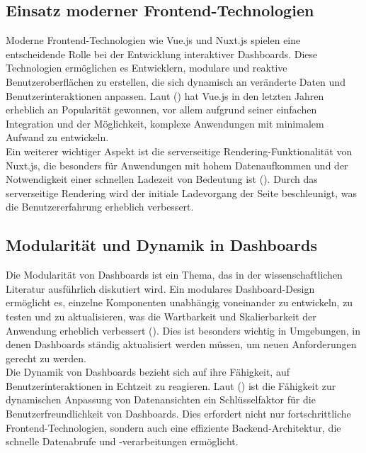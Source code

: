 \documentclass[a4paper, 12pt]{scrartcl}
\begin{document}
\subsection{Einsatz moderner Frontend-Technologien}
Moderne Frontend-Technologien wie Vue.js und Nuxt.js spielen eine entscheidende Rolle bei der Entwicklung interaktiver Dashboards. Diese Technologien ermöglichen es Entwicklern, modulare und reaktive Benutzeroberflächen zu erstellen, die sich dynamisch an veränderte Daten und Benutzerinteraktionen anpassen. Laut (\cite[S.119]{Dibia2023}) hat Vue.js in den letzten Jahren erheblich an Popularität gewonnen, vor allem aufgrund seiner einfachen Integration und der Möglichkeit, komplexe Anwendungen mit minimalem Aufwand zu entwickeln.\\[1em] Ein weiterer wichtiger Aspekt ist die serverseitige Rendering-Funktionalität von Nuxt.js, die besonders für Anwendungen mit hohem Datenaufkommen und der Notwendigkeit einer schnellen Ladezeit von Bedeutung ist (\cite[S.119]{Dibia2023}). Durch das serverseitige Rendering wird der initiale Ladevorgang der Seite beschleunigt, was die Benutzererfahrung erheblich verbessert.
\newpage

\subsection{Modularität und Dynamik in Dashboards}
Die Modularität von Dashboards ist ein Thema, das in der wissenschaftlichen Literatur ausführlich diskutiert wird. Ein modulares Dashboard-Design ermöglicht es, einzelne Komponenten unabhängig voneinander zu entwickeln, zu testen und zu aktualisieren, was die Wartbarkeit und Skalierbarkeit der Anwendung erheblich verbessert (\cite[S.119]{Dibia2023}). Dies ist besonders wichtig in Umgebungen, in denen Dashboards ständig aktualisiert werden müssen, um neuen Anforderungen gerecht zu werden.\\[1em]Die Dynamik von Dashboards bezieht sich auf ihre Fähigkeit, auf Benutzerinteraktionen in Echtzeit zu reagieren. Laut (\cite[S.119]{Dibia2023}) ist die Fähigkeit zur dynamischen Anpassung von Datenansichten ein Schlüsselfaktor für die Benutzerfreundlichkeit von Dashboards. Dies erfordert nicht nur fortschrittliche Frontend-Technologien, sondern auch eine effiziente Backend-Architektur, die schnelle Datenabrufe und -verarbeitungen ermöglicht.
\end{document}
